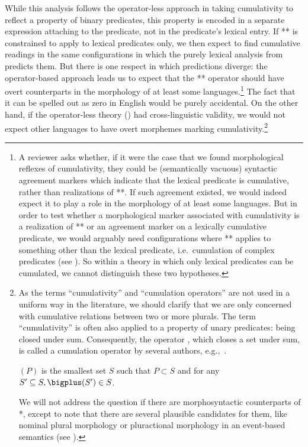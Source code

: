 \documentclass[output=paper]{langscibook}
\begin{document}
\noindent While this analysis follows the operator-less approach in taking cumulativity to reflect a property of binary predicates, this property is encoded in a separate expression attaching to the predicate, not in the predicate's lexical entry. If ** is constrained to apply to lexical predicates only,  we then expect to find cumulative readings in the same configurations in which the purely lexical analysis from  predicts them. But there is one respect in which predictions diverge: the operator-based approach leads us to expect that the ** operator should have overt counterparts in the morphology of at least some languages.\footnote{A reviewer asks whether, if it were the case that we found morphological reflexes of cumulativity, they could be (semantically vacuous) syntactic agreement markers which indicate that the lexical predicate is cumulative, rather than realizations of **. If such agreement existed, we would indeed expect it to play a role in the morphology of at least some languages. But in order to test whether a morphological marker associated with cumulativity is a realization of ** or an agreement marker on a lexically cumulative predicate, we would arguably need configurations where ** applies to something other than the lexical predicate, i.e.~cumulation of complex predicates (see ). So within a theory in which only lexical predicates can be cumulated, we cannot distinguish these two hypotheses.} The fact that it can be spelled out as zero in English would be purely accidental. On the other hand, if the operator-less theory () had cross-linguistic validity, we would not expect other languages to have overt morphemes marking cumulativity.\footnote{As the terms 
``cumulativity'' and ``cumulation operators'' are not used in a uniform way in the literature, we should clarify that we are only concerned with cumulative relations between two or more plurals. The term ``cumulativity'' is often also applied to a property of unary predicates: being closed under sum. Consequently, the operator , which closes a set under sum, is called a cumulation operator by several authors, e.g.,~\citet{Sternefeld:1998}.

\ea \label{has-sch:onestar}\sib{*}$(P)$ is the smallest set $S$ such that $P \subset S$ and for any $S' \subseteq S, \bigplus(S') \in S$.\z

\noindent We will not address the question if there are morphosyntactic counterparts of *, except to note that there are several plausible candidates for them, like nominal plural morphology \citep{Sternefeld:1998} or pluractional morphology in an event-based semantics (see ).}
\end{document}
